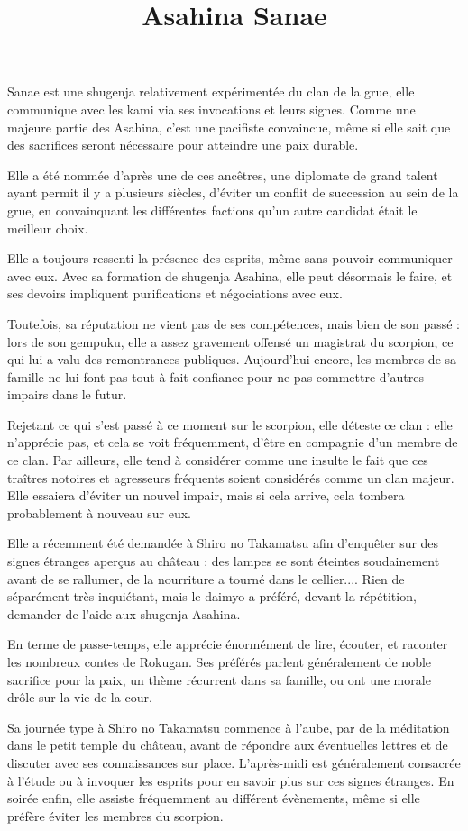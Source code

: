 \documentclass[10pt,a4paper]{article}
\title{Asahina Sanae}
\author{}
\date{}
\begin{document}
\maketitle
Sanae est une shugenja relativement expérimentée du clan de la grue, elle communique avec les kami via ses invocations et leurs signes. Comme une majeure partie des Asahina, c'est une pacifiste convaincue, même si elle sait que des sacrifices seront nécessaire pour atteindre une paix durable.

Elle a été nommée d'après une de ces ancêtres, une diplomate de grand talent ayant permit il y a plusieurs siècles, d'éviter un conflit de succession au  sein de la grue, en convainquant les différentes factions qu'un autre candidat était le meilleur choix.

Elle a toujours ressenti la présence des esprits, même sans pouvoir communiquer avec eux. Avec sa formation de shugenja Asahina, elle peut désormais le faire, et ses devoirs impliquent purifications et négociations avec eux.

Toutefois, sa réputation ne vient pas de ses compétences, mais bien de son passé : lors de son gempuku, elle a assez gravement offensé un magistrat du scorpion, ce qui lui a valu des remontrances publiques. Aujourd'hui encore, les membres de sa famille ne lui font pas tout à fait confiance pour ne pas commettre d'autres impairs dans le futur.

Rejetant ce qui s'est passé à ce moment sur le scorpion, elle déteste ce clan : elle n'apprécie pas, et cela se voit fréquemment, d'être en compagnie d'un membre de ce clan. Par ailleurs, elle tend à considérer comme une insulte le fait que ces traîtres notoires et agresseurs fréquents soient considérés comme un clan majeur. Elle essaiera d'éviter un nouvel impair, mais si cela arrive, cela tombera probablement à nouveau sur eux.

Elle a récemment été demandée à Shiro no Takamatsu afin d'enquêter sur des signes étranges aperçus au château : des lampes se sont éteintes soudainement avant de se rallumer, de la nourriture a tourné dans le cellier.... Rien de séparément très inquiétant, mais le daimyo a préféré, devant la répétition, demander de l'aide aux shugenja Asahina.

En terme de passe-temps, elle apprécie énormément de lire, écouter, et raconter les nombreux contes de Rokugan. Ses préférés parlent généralement de noble sacrifice pour la paix, un thème récurrent dans sa famille, ou ont une morale drôle sur la vie de la cour.

Sa journée type à Shiro no Takamatsu commence à l'aube, par de la méditation dans le petit temple du château, avant de répondre aux éventuelles lettres et de discuter avec ses connaissances sur place. L'après-midi est généralement consacrée à l'étude ou à invoquer les esprits pour en savoir plus sur ces signes étranges. En soirée enfin, elle assiste fréquemment au différent évènements, même si elle préfère éviter les membres du scorpion.
\end{document}
